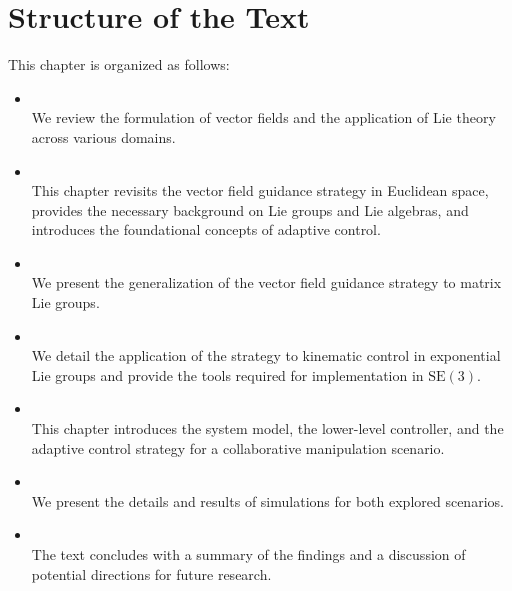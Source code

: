 \section{Structure of the Text}
This chapter is organized as follows:
\begin{itemize}
    \item {}\\
    We review the formulation of vector fields and the application of Lie theory across various domains.
    \item {}\\
    This chapter revisits the vector field guidance strategy in Euclidean space, provides the necessary background on Lie groups and Lie algebras, and introduces the foundational concepts of adaptive control.
    \item {}\\
    We present the generalization of the vector field guidance strategy to matrix Lie groups.
    \item {}\\
    We detail the application of the strategy to kinematic control in exponential Lie groups and provide the tools required for implementation in $\text{SE}(3)$.
    \item {}\\
    This chapter introduces the system model, the lower-level controller, and the adaptive control strategy for a collaborative manipulation scenario.
    \item {}\\
    We present the details and results of simulations for both explored scenarios.
    \item {}\\
    The text concludes with a summary of the findings and a discussion of potential directions for future research.
\end{itemize}

